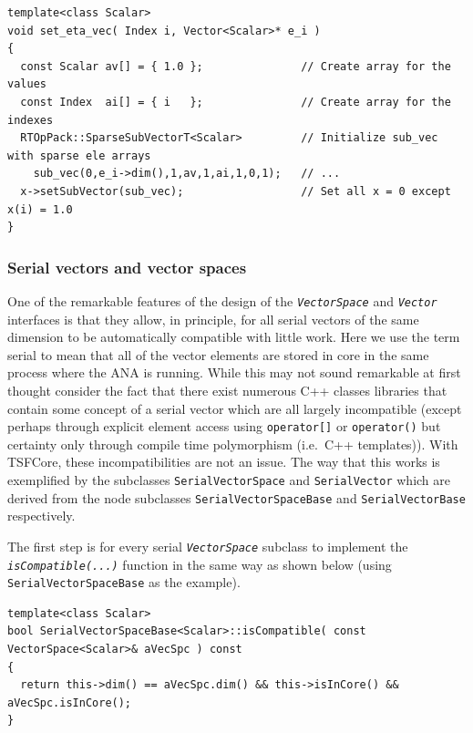 {\scriptsize\begin{verbatim}
template<class Scalar>
void set_eta_vec( Index i, Vector<Scalar>* e_i )
{
  const Scalar av[] = { 1.0 };               // Create array for the values
  const Index  ai[] = { i   };               // Create array for the indexes
  RTOpPack::SparseSubVectorT<Scalar>         // Initialize sub_vec with sparse ele arrays
    sub_vec(0,e_i->dim(),1,av,1,ai,1,0,1);   // ...
  x->setSubVector(sub_vec);                  // Set all x = 0 except x(i) = 1.0
}
\end{verbatim}}

%
\subsubsection{Serial vectors and vector spaces}
\label{tsfcore:sec:serial_vecs}
%

One of the remarkable features of the design of the
{}\texttt{\textit{VectorSpace}} and {}\texttt{\textit{Vector}}
interfaces is that they allow, in principle, for all serial vectors of
the same dimension to be automatically compatible with little work.
Here we use the term serial to mean that all of the vector elements
are stored in core in the same process where the ANA is running.
While this may not sound remarkable at first thought consider the fact
that there exist numerous C++ classes libraries that contain some
concept of a serial vector {}\cite{ref:lumsdaine_and_siek_1998,
ref:tnt, ref:roberts_et_al_1996, ref:math++_1996} which are all
largely incompatible (except perhaps through explicit element access
using {}\texttt{operator[]} or {}\texttt{operator()} but certainty
only through compile time polymorphism (i.e.~C++ templates)).  With
TSFCore, these incompatibilities are not an issue.  The way that this
works is exemplified by the subclasses {}\texttt{SerialVectorSpace}
and {}\texttt{SerialVector} which are derived from the node subclasses
{}\texttt{Serial\-VectorSpace\-Base} and {}\texttt{SerialVectorBase}
respectively.

The first step is for every serial {}\texttt{\textit{VectorSpace}}
subclass to implement the {}\texttt{\textit{isCompatible(\-...)}}
function in the same way as shown below (using
{}\texttt{SerialVectorSpaceBase} as the example).

{\scriptsize\begin{verbatim}
template<class Scalar>
bool SerialVectorSpaceBase<Scalar>::isCompatible( const VectorSpace<Scalar>& aVecSpc ) const
{
  return this->dim() == aVecSpc.dim() && this->isInCore() && aVecSpc.isInCore();
}
\end{verbatim}}

